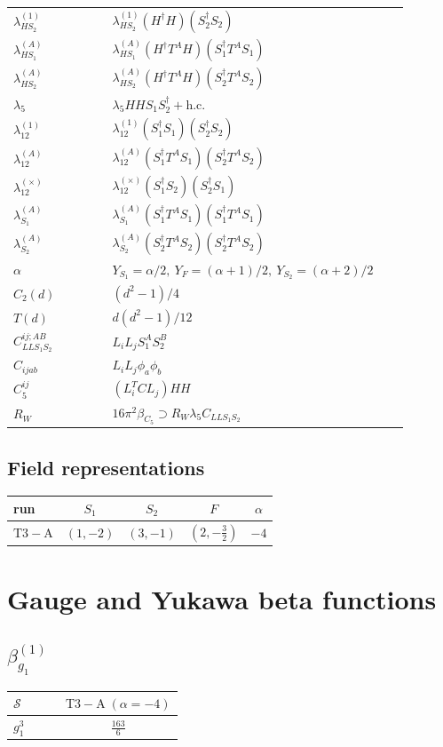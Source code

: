 \documentclass[9pt]{article}
\begin{document}
\begin{longtable}{@{}p{0.23\linewidth}p{0.69\linewidth}@{}}
$\lambda_{HS_2}^{(1)}$ & $\lambda_{HS_2}^{(1)}(H^\dagger H)(S_2^\dagger S_2)$ \\
$\lambda_{HS_1}^{(A)}$ & $\lambda_{HS_1}^{(A)}(H^\dagger T^AH)(S_1^\dagger T^AS_1)$ \\
$\lambda_{HS_2}^{(A)}$ & $\lambda_{HS_2}^{(A)}(H^\dagger T^AH)(S_2^\dagger T^AS_2)$ \\
$\lambda_5$ & $\lambda_5HHS_1S_2^\dagger+\mathrm{h.c.}$ \\
$\lambda_{12}^{(1)}$ & $\lambda_{12}^{(1)}(S_1^\dagger S_1)(S_2^\dagger S_2)$ \\
$\lambda_{12}^{(A)}$ & $\lambda_{12}^{(A)}(S_1^\dagger T^AS_1)(S_2^\dagger T^AS_2)$ \\
$\lambda_{12}^{(\times)}$ & $\lambda_{12}^{(\times)}(S_1^\dagger S_2)(S_2^\dagger S_1)$ \\
$\lambda_{S_1}^{(A)}$ & $\lambda_{S_1}^{(A)}(S_1^\dagger T^A S_1)(S_1^\dagger T^A S_1)$ \\
$\lambda_{S_2}^{(A)}$ & $\lambda_{S_2}^{(A)}(S_2^\dagger T^A S_2)(S_2^\dagger T^A S_2)$ \\
$\alpha$ & $Y_{S_1}=\alpha/2,\ Y_F=(\alpha+1)/2,\ Y_{S_2}=(\alpha+2)/2$ \\
$C_2(d)$ & $(d^2-1)/4$ \\
$T(d)$ & $d(d^2-1)/12$ \\
$C_{LLS_1S_2}^{ij;AB}$ & $L_iL_jS_1^AS_2^B$ \\
$C_{ijab}$ & $L_iL_j\phi_a\phi_b$ \\
$C_5^{ij}$ & $(L_i^TCL_j)HH$ \\
$R_W$ & $16\pi^2\beta_{C_5}\supset R_W\lambda_5C_{LLS_1S_2}$ \\
\bottomrule
\end{longtable}
\subsection*{Field representations}
\begin{longtable}{@{}lcccc@{}}
\toprule
run & $S_1$ & $S_2$ & $F$ & $\alpha$ \\
\midrule
$\mathrm{T3-A}$ & $(1,-2)$ & $(3,-1)$ & $(2,- \frac{3}{2})$ & $-4$ \\
\bottomrule
\end{longtable}
\section*{Gauge and Yukawa beta functions}
\subsection*{$ \beta_{g_1}^{(1)} $}
\begin{longtable}{@{}p{0.38\linewidth}c@{}}
\toprule
$\mathcal{S}$ & $ \mathrm{T3-A}\;(\alpha=-4) $ \\
\midrule
$ g_1^3 $ & $ \frac{163}{6} $ \\
\bottomrule
\end{longtable}
\end{document}
